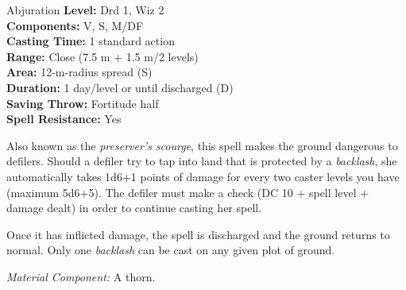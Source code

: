 {Abjuration}
{
	\textbf{Level:}
	Drd 1, Wiz 2\\
	\textbf{Components:}
	V, S, M/DF\\
	\textbf{Casting Time:}
	1 standard action\\
	\textbf{Range:}
	Close (7.5 m + 1.5 m/2 levels)\\
	\textbf{Area:}
	12-m-radius spread (S)\\
	\textbf{Duration:}
	1 day/level or until discharged (D)\\
	\textbf{Saving Throw:}
	Fortitude half\\
	\textbf{Spell Resistance:}
	Yes\\
}
{
	Also known as the \emph{preserver's scourge}, this spell makes the ground dangerous to defilers. Should a defiler try to tap into land that is protected by a \emph{backlash}, she automatically takes 1d6+1 points of damage for every two caster levels you have (maximum 5d6+5). The defiler must make a  check (DC 10 + spell level + damage dealt) in order to continue casting her spell.

	Once it has inflicted damage, the spell is discharged and the ground returns to normal. Only one \emph{backlash} can be cast on any given plot of ground.

	\textit{Material Component:} A thorn.
}